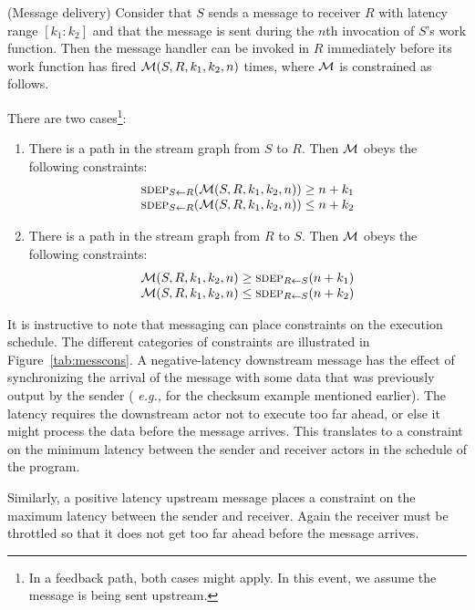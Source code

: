 \begin{definition}(Message delivery)
Consider that $S$ sends a message to receiver $R$ with latency range
$[k_1:k_2]$ and that the message is sent during the $n$th invocation
of $S$'s work function.  Then the message handler can be invoked in
$R$ immediately before its work function has fired ${\cal M}(S, R,
k_1, k_2, n)$ times, where ${\cal M}$ is constrained as follows.

There are two cases\footnote{\small In a feedback path, both cases might apply.  In this event, we assume the message is being sent upstream.}:
\begin{enumerate}

\item There is a path in the stream graph from $S$ to $R$.  Then
${\cal M}$ obeys the following constraints:
\[
\begin{array}{l}
\sdepf{S}{R}({\cal M}(S, R, k_1, k_2, n)) \ge n+k_1\\
\sdepf{S}{R}({\cal M}(S, R, k_1, k_2, n)) \le n+k_2
\end{array}
\]

\item There is a path in the stream graph from $R$ to $S$.  Then
${\cal M}$ obeys the following constraints:
\[
\begin{array}{l}
{\cal M}(S, R, k_1, k_2, n) \ge \sdepf{R}{S}(n + k_1)\\
{\cal M}(S, R, k_1, k_2, n) \le \sdepf{R}{S}(n + k_2)
\end{array}
\]
\end{enumerate}
\end{definition}

It is instructive to note that messaging can place constraints on the
execution schedule.  The different categories of constraints are
illustrated in Figure~\ref{tab:messcons}.  A negative-latency
downstream message has the effect of synchronizing the arrival of the
message with some data that was previously output by the sender ({\it
e.g.,} for the checksum example mentioned earlier).  The latency
requires the downstream actor not to execute too far ahead, or else it
might process the data before the message arrives.  This translates to
a constraint on the minimum latency between the sender and receiver
actors in the schedule of the program.

Similarly, a positive latency upstream message places a constraint on
the maximum latency between the sender and receiver.  Again the
receiver must be throttled so that it does not get too far ahead
before the message arrives.

